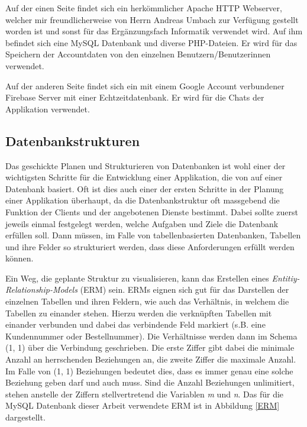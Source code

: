 \documentclass[../main.tex]{subfiles}
\begin{document}
	Auf der einen Seite findet sich ein herkömmlicher Apache HTTP Webserver, welcher mir freundlicherweise von Herrn Andreas Umbach zur Verfügung gestellt worden ist und sonst für das Ergänzungsfach Informatik verwendet wird. Auf ihm befindet sich eine MySQL Datenbank und diverse PHP-Dateien. Er wird für das Speichern der Accountdaten von den einzelnen Benutzern/Benutzerinnen verwendet.
	
	Auf der anderen Seite findet sich ein mit einem Google Account verbundener Firebase Server mit einer Echtzeitdatenbank. Er wird für die Chats der Applikation verwendet.
	
	\subsection{Datenbankstrukturen}
	Das geschickte Planen und Strukturieren von Datenbanken ist wohl einer der wichtigsten Schritte für die Entwicklung einer Applikation, die von auf einer Datenbank basiert. Oft ist dies auch einer der ersten Schritte in der Planung einer Applikation überhaupt, da die Datenbankstruktur oft massgebend die Funktion der Clients und der angebotenen Dienste bestimmt. Dabei sollte zuerst jeweils einmal festgelegt werden, welche Aufgaben und Ziele die Datenbank erfüllen soll. Dann müssen, im Falle von tabellenbasierten Datenbanken, Tabellen und ihre Felder so strukturiert werden, dass diese Anforderungen erfüllt werden können. 
	
	Ein Weg, die geplante Struktur zu visualisieren, kann das Erstellen eines \emph{Entitiy-Relationship-Models} (ERM) sein. ERMs eignen sich gut für das Darstellen der einzelnen Tabellen und ihren Feldern, wie auch das Verhältnis, in welchem die Tabellen zu einander stehen. Hierzu werden die verknüpften Tabellen mit einander verbunden und dabei das verbindende Feld markiert (s.B. eine Kundennummer oder Bestellnummer). Die Verhältnisse werden dann im Schema (1, 1) über die Verbindung geschrieben. Die erste Ziffer gibt dabei die minimale Anzahl an herrschenden Beziehungen an, die zweite Ziffer die maximale Anzahl. Im Falle von (1, 1) Beziehungen bedeutet dies, dass es immer genau eine solche Beziehung geben darf und auch muss. Sind die Anzahl Beziehungen unlimitiert, stehen anstelle der Ziffern stellvertretend die Variablen \emph{m} und \emph{n}. Das für die MySQL Datenbank dieser Arbeit verwendete ERM ist in Abbildung \ref{ERM} dargestellt.
	
\end{document}
